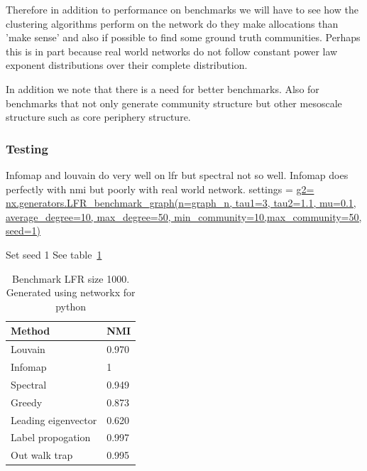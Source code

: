 Therefore in addition to performance on benchmarks we will have to see how the clustering algorithms perform on the network do they make allocations than 'make sense' and also if possible to find some ground truth communities. Perhaps this is in part because real world networks do not follow constant power law exponent distributions over their complete distribution. 

In addition we note that there is a need for better benchmarks. Also for benchmarks that not only generate community structure but other mesoscale structure such as core periphery structure. 
\subsubsection{Testing}
Infomap and louvain do very well on lfr but spectral not so well. Infomap does perfectly with nmi but poorly with real world network. 
settings = \url{g2= nx.generators.LFR_benchmark_graph(n=graph_n, tau1=3, tau2=1.1, mu=0.1, average_degree=10, max_degree=50, min_community=10,max_community=50, seed=1)}

Set seed 1 See table~\ref{tab:benchmark LFR size 1000}

\begin{table}[h]
    \centering
    \begin{tabular}{ll}
    \toprule
     Method    & NMI  \\
     \midrule
    Louvain     & 0.970\\
    Infomap     & 1\\
    Spectral & 0.949\\
    Greedy & 0.873\\
    Leading eigenvector & 0.620\\
    Label propogation & 0.997\\
    Out walk trap & 0.995\\
    \bottomrule
    \end{tabular}
    \caption{Benchmark LFR size 1000. Generated using networkx for python}
    \label{tab:benchmark LFR size 1000}
\end{table}





